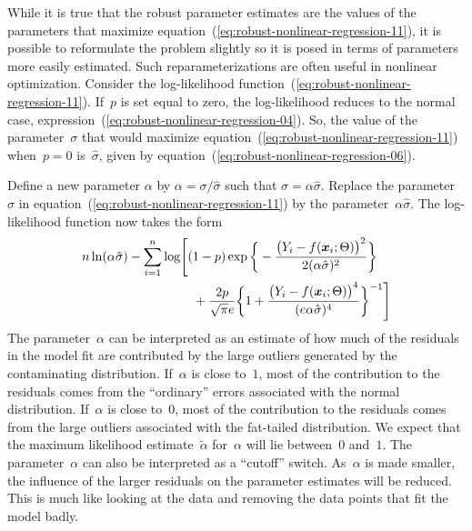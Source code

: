 \documentclass{admbmanual}
\begin{document}
While it is true that the robust parameter estimates are the values of the
parameters that maximize equation~(\ref{eq:robust-nonlinear-regression-11}), it
is possible to reformulate the problem slightly so it is posed in terms of
parameters more easily estimated. Such reparameterizations are often useful in
nonlinear optimization. Consider the log-likelihood
function~(\ref{eq:robust-nonlinear-regression-11}). %
If~$p$ is set equal to zero, the log-likelihood reduces to the normal case,
expression~(\ref{eq:robust-nonlinear-regression-04}). So, the value of the
parameter~$\sigma$ that would maximize
equation~(\ref{eq:robust-nonlinear-regression-11}) when~$p=0$ is~$\hat\sigma$,
given by
equation~(\ref{eq:robust-nonlinear-regression-06}). %

Define a new parameter $\alpha$ by $\alpha=\sigma/\hat\sigma$ such that
$\sigma=\alpha\hat\sigma$. Replace the parameter~$\sigma$ in
equation~(\ref{eq:robust-nonlinear-regression-11}) %
by the parameter~$\alpha\hat\sigma$. The log-likelihood function now takes the
form
\begin{align}
  \label{eq:robust-nonlinear-regression-12} %
  \nonumber
  n\ln(\alpha\hat\sigma)-\sum_{i=1}^n \log
  & \Bigg[
  (1-p)\exp\bigg\{-\frac{\big(Y_i-f({\mbox{\boldmath $x$}}_i;\Theta)\big)^2}
  {2(\alpha\hat\sigma)^2}\bigg\}\\
  &\quad + \frac{2p}{\sqrt{\pi}e}
  \bigg\{1+\frac{\big(Y_i-f({\mbox{\boldmath $x$}}_i;\Theta)\big)^4}
  {(e\alpha\hat\sigma)^4}\bigg\}^{-1}
  \Bigg]
\end{align}
The parameter~$\alpha$ can be interpreted as an estimate of how much of the
residuals in the model fit are contributed by the large outliers generated by
the contaminating distribution. If~$\alpha$ is close to~$1$, most of the
contribution to the residuals comes from the ``ordinary'' errors associated with
the normal distribution. If~$\alpha$ is close to~$0$, most of the contribution
to the residuals comes from the large outliers associated with the fat-tailed
distribution. We expect that the maximum likelihood estimate~$\tilde \alpha$
for~$\alpha$ will lie between~$0$ and~$1$. The parameter~$\alpha$ can also be
interpreted as a ``cutoff'' switch. As~$\alpha$ is made smaller, the influence
of the larger residuals on the parameter estimates will be reduced. This is much
like looking at the data and removing the data points that fit the model badly.
\end{document}
